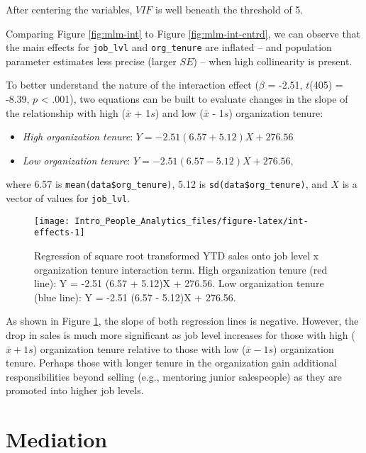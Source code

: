 \documentclass[
]{book}
\providecommand{\tightlist}{%
  \setlength{\itemsep}{0pt}\setlength{\parskip}{0pt}}
\begin{document}
After centering the variables, \(VIF\) is well beneath the threshold of 5.

Comparing Figure \ref{fig:mlm-int} to Figure \ref{fig:mlm-int-cntrd}, we can observe that the main effects for \texttt{job\_lvl} and \texttt{org\_tenure} are inflated -- and population parameter estimates less precise (larger \(SE\)) -- when high collinearity is present.

To better understand the nature of the interaction effect (\(\beta\) = -2.51, \(t\)(405) = -8.39, \(p\) \textless{} .001), two equations can be built to evaluate changes in the slope of the relationship with high (\(\bar{x}\) + 1\(s\)) and low (\(\bar{x}\) - 1\(s\)) organization tenure:

\begin{itemize}
\tightlist
\item
  \emph{High organization tenure}: \(Y = -2.51 (6.57 + 5.12)X + 276.56\)
\item
  \emph{Low organization tenure}: \(Y = -2.51 (6.57 - 5.12)X + 276.56,\)
\end{itemize}

where 6.57 is \texttt{mean(data\$org\_tenure)}, 5.12 is \texttt{sd(data\$org\_tenure)}, and \(X\) is a vector of values for \texttt{job\_lvl}.

\begin{figure}

{\centering \texttt{[image: Intro\_People\_Analytics\_files/figure-latex/int-effects-1]} 

}

\caption{Regression of square root transformed YTD sales onto job level x organization tenure interaction term. High organization tenure (red line): Y = -2.51 (6.57 + 5.12)X + 276.56. Low organization tenure (blue line): Y = -2.51 (6.57 - 5.12)X + 276.56.}\label{fig:int-effects}
\end{figure}

As shown in Figure \ref{fig:int-effects}, the slope of both regression lines is negative. However, the drop in sales is much more significant as job level increases for those with high (\(\bar{x} + 1s\)) organization tenure relative to those with low (\(\bar{x} - 1s\)) organization tenure. Perhaps those with longer tenure in the organization gain additional responsibilities beyond selling (e.g., mentoring junior salespeople) as they are promoted into higher job levels.

\hypertarget{mediation}{%
\section{Mediation}\label{mediation}}
\end{document}
